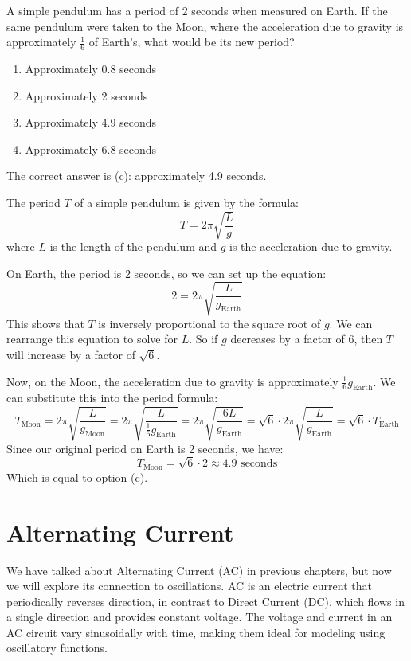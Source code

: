 \begin{Exercise}
	[label={ex:pendulumMoon}, title={Pendulum on the Moon}] A simple pendulum has
	a period of 2 seconds when measured on Earth. If the same pendulum were taken to
	the Moon, where the acceleration due to gravity is approximately $\frac{1}{6}$ of Earth's,
	what would be its new period?
	\begin{enumerate}[label=\alph{*}]
		\item Approximately 0.8 seconds

		\item Approximately 2 seconds

		\item Approximately 4.9 seconds

		\item Approximately 6.8 seconds
	\end{enumerate}
\end{Exercise}
\begin{Answer}
	[ref={ex:pendulumMoon}] The correct answer is (c): approximately 4.9 seconds.

	The period $T$ of a simple pendulum is given by the formula:
	\[
		T = 2\pi \sqrt{\frac{L}{g}}
	\]
	where $L$ is the length of the pendulum and $g$ is the acceleration due to gravity.

	On Earth, the period is 2 seconds, so we can set up the equation:
	\[
		2 = 2\pi \sqrt{\frac{L}{g_{\text{Earth}}}}
	\]
	This shows that $T$ is inversely proportional to the square root of $g $. We can
	rearrange this equation to solve for $L $. So if $g$ decreases by a factor of 6,
	then $T$ will increase by a factor of $\sqrt{6}$.

	Now, on the Moon, the acceleration due to gravity is approximately $\frac{1}{6}
	g_{\text{Earth}}$. We can substitute this into the period formula:
	\[
		T_{\text{Moon}}= 2\pi \sqrt{\frac{L}{g_{\text{Moon}}}}= 2\pi \sqrt{\frac{L}{\frac{1}{6}g_{\text{Earth}}}}
		= 2\pi \sqrt{\frac{6L}{g_{\text{Earth}}}}= \sqrt{6}\cdot 2\pi \sqrt{\frac{L}{g_{\text{Earth}}}}
		= \sqrt{6}\cdot T_{\text{Earth}}
	\]
	Since our original period on Earth is 2 seconds, we have:
	\[
		T_{\text{Moon}}= \sqrt{6}\cdot 2 \approx 4.9 \text{ seconds}
	\]
	Which is equal to option (c).
\end{Answer}

\section{Alternating Current}
We have talked about Alternating Current (AC) in previous chapters, but now we will
explore its connection to oscillations. AC is an electric current that
periodically reverses direction, in contrast to Direct Current (DC), which flows
in a single direction and provides constant voltage. The voltage and current in an
AC circuit vary sinusoidally with time, making them ideal for modeling using
oscillatory functions. 

